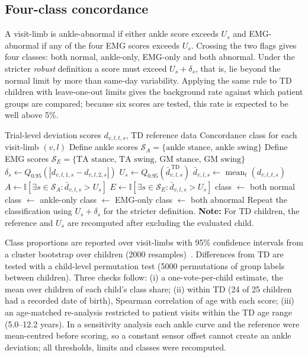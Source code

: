 \documentclass[conference]{IEEEtran}
\begin{document}
\subsection{Four-class concordance}
A visit-limb is ankle-abnormal if either ankle score exceeds $U_s$ and EMG-abnormal if any of the four EMG scores exceeds $U_s$. Crossing the two flags gives four classes: both normal, ankle-only, EMG-only and both abnormal. Under the stricter \emph{robust} definition a score must exceed $U_s+\delta_s$, that is, lie beyond the normal limit by more than same-day variability. Applying the same rule to TD children with leave-one-out limits gives the background rate against which patient groups are compared; because six scores are tested, this rate is expected to be well above 5\%.
\begin{algorithm}[t]
\caption{Repeatability-Calibrated EMG--Kinematic Concordance}
\label{alg:concordance}
\begin{algorithmic}[1]
\Require Trial-level deviation scores $d_{v,l,t,s}$, TD reference data
\Ensure Concordance class for each visit-limb $(v,l)$
\State Define ankle scores $\mathcal{S}_{A}=\{\text{ankle stance, ankle swing}\}$
\State Define EMG scores $\mathcal{S}_{E}=\{\text{TA stance, TA swing, GM stance, GM swing}\}$
    \State $\delta_s \gets Q_{0.95}\!\left(
    \left|d_{v,l,1,s}-d_{v,l,2,s}\right|\right)$
    \State $U_s \gets Q_{0.95}\!\left(\bar d_{v,l,s}^{\,\mathrm{TD}}\right)$
\EndFor
{}
    \State $\bar d_{v,l,s}\gets \operatorname{mean}_{t}(d_{v,l,t,s})$
    \State $A\gets\mathbb{I}\!\left[
    \exists s\in\mathcal{S}_{A}:\bar d_{v,l,s}>U_s\right]$
    \State $E\gets\mathbb{I}\!\left[
    \exists s\in\mathcal{S}_{E}:\bar d_{v,l,s}>U_s\right]$
        \State class $\gets$ both normal
        \State class $\gets$ ankle-only
        \State class $\gets$ EMG-only
    \Else
        \State class $\gets$ both abnormal
    \EndIf
\EndFor
\State Repeat the classification using $U_s+\delta_s$ for the stricter definition.
\Statex \textbf{Note:} For TD children, the reference and $U_s$ are recomputed after excluding the evaluated child.
\end{algorithmic}
\end{algorithm}

Class proportions are reported over visit-limbs with 95\% confidence intervals from a cluster bootstrap over children (2000 resamples)~\cite{efron1993bootstrap}. Differences from TD are tested with a child-level permutation test (5000 permutations of group labels between children). Three checks follow: (i) a one-vote-per-child estimate, the mean over children of each child's class share; (ii) within TD (24 of 25 children had a recorded date of birth), Spearman correlation of age with each score; (iii) an age-matched re-analysis restricted to patient visits within the TD age range (5.0--12.2 years). In a sensitivity analysis each ankle curve and the reference were mean-centred before scoring, so a constant sensor offset cannot create an ankle deviation; all thresholds, limits and classes were recomputed.
\end{document}
